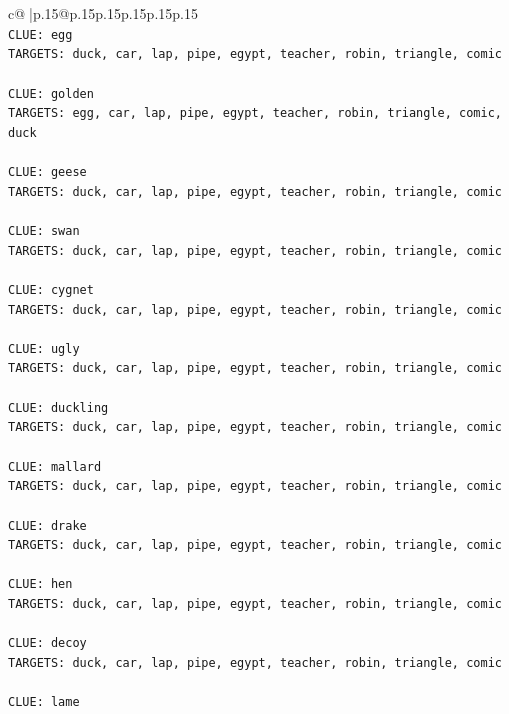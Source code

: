 \documentclass{article}
\begin{document}
{\begin{supertabular}{c@{$\;$}|p{.15\linewidth}@{}p{.15\linewidth}p{.15\linewidth}p{.15\linewidth}p{.15\linewidth}p{.15\linewidth}}
{{{\\ 
\texttt{CLUE: egg} \\
\texttt{TARGETS: duck, car, lap, pipe, egypt, teacher, robin, triangle, comic} \\
\\ 
\texttt{CLUE: golden} \\
\texttt{TARGETS: egg, car, lap, pipe, egypt, teacher, robin, triangle, comic, duck} \\
\\ 
\texttt{CLUE: geese} \\
\texttt{TARGETS: duck, car, lap, pipe, egypt, teacher, robin, triangle, comic} \\
\\ 
\texttt{CLUE: swan} \\
\texttt{TARGETS: duck, car, lap, pipe, egypt, teacher, robin, triangle, comic} \\
\\ 
\texttt{CLUE: cygnet} \\
\texttt{TARGETS: duck, car, lap, pipe, egypt, teacher, robin, triangle, comic} \\
\\ 
\texttt{CLUE: ugly} \\
\texttt{TARGETS: duck, car, lap, pipe, egypt, teacher, robin, triangle, comic} \\
\\ 
\texttt{CLUE: duckling} \\
\texttt{TARGETS: duck, car, lap, pipe, egypt, teacher, robin, triangle, comic} \\
\\ 
\texttt{CLUE: mallard} \\
\texttt{TARGETS: duck, car, lap, pipe, egypt, teacher, robin, triangle, comic} \\
\\ 
\texttt{CLUE: drake} \\
\texttt{TARGETS: duck, car, lap, pipe, egypt, teacher, robin, triangle, comic} \\
\\ 
\texttt{CLUE: hen} \\
\texttt{TARGETS: duck, car, lap, pipe, egypt, teacher, robin, triangle, comic} \\
\\ 
\texttt{CLUE: decoy} \\
\texttt{TARGETS: duck, car, lap, pipe, egypt, teacher, robin, triangle, comic} \\
\\ 
\texttt{CLUE: lame} \\
}}}
\end{supertabular}}
\end{document}
